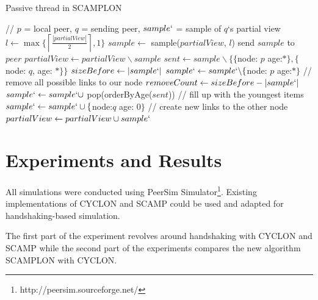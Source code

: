 \documentclass[11pt, english, screen]{report-rd-info}
\begin{document}
\begin{algorithm*}[!htbp]
    \caption{Passive thread in SCAMPLON}
    \begin{algorithmic}[1]
         // $p$ = local peer, $q$ = sending peer, $sample`$ = sample of $q$`s partial view
        \State $l \gets \max \{\left \lceil{\frac{|partialView|}{2}}\right \rceil, 1\}$
        \State $sample \gets$ sample($partialView$, $l$)
        \State send $sample$ to $peer$
        \State $partialView \gets partialView \backslash sample$
        \State $sent \gets sample \backslash \{\{$node: $p $ age:$*\}, \{$node: $q$, age: $*\} \}$
        \State $sizeBefore \gets |sample`|$
        \State $sample` \gets sample`\backslash \{$node: $p $ age:$* \}$ // remove all possible links to our node
        \State $removeCount \gets sizeBefore - |sample`|$
        \State $sample` \gets sample` \cup $ pop(orderByAge($sent$)) // fill up with the youngest items
        \Else
        \State $sample` \gets sample` \cup \{ $node:$q $ age: $0\}$ // create new links to the other node
        \EndIf
        \EndFor
        \EndIf
        \State $partialView \gets partialView \cup sample`$
        \EndProcedure
    \end{algorithmic}
    \label{alg:scamplon2}
\end{algorithm*}




\chapter{Experiments and Results}
\label{chap:Experiments}

All simulations were conducted using PeerSim Simulator\footnote{http://peersim.sourceforge.net/}. 
Existing implementations of CYCLON and SCAMP could be used and adapted for handshaking-based simulation.

The first part of the experiment revolves around handshaking with CYCLON and SCAMP while the second part of the  experiments compares the new algorithm SCAMPLON with CYCLON.
\end{document}
